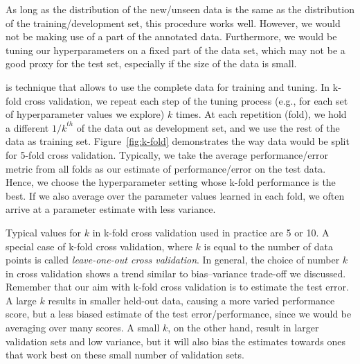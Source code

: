 As long as the distribution of the new/unseen data
is the same as the distribution of the training/development set,
this procedure works well.
However, we would not be making use of a part of the annotated data.
Furthermore, we would be tuning our hyperparameters
on a fixed part of the data set,
which may not be a good proxy for the test set,
especially if the size of the data is small.

\begin{marginfigure}
  \centering
  \caption{\label{fig:k-fold}%
    A schematic description of k-fold cross validation.
    Each row correspond to an experiment
    where the part of the data (marked red) is held-out,
    and the rest (blue segments) is used for training.
  }
\end{marginfigure}
 is technique that allows
to use the complete data for training and tuning.
In k-fold cross validation,
we repeat each step of the tuning process
(e.g., for each set of hyperparameter values we explore) $k$ times.
At each repetition (fold),
we hold a different ${1/k}^{th}$ of the data out as development set,
and we use the rest of the data as training set.
Figure~\ref{fig:k-fold} demonstrates the way data would be split
for 5-fold cross validation.
Typically, we take the average performance/error metric from all folds
as our estimate of performance/error on the test data.
Hence, we choose the hyperparameter setting
whose k-fold performance is the best.
If we also average over the parameter values learned in each fold,
we often arrive at a parameter estimate with less variance.

Typical values for $k$ in k-fold cross validation used in practice
are  \num{5} or \num{10}.
A special case of k-fold cross validation,
where $k$ is equal to the number of data points
is called \emph{leave-one-out cross validation}.
In general, the choice of number $k$ in cross validation
shows a trend similar to bias--variance trade-off we discussed.
Remember that our aim with k-fold cross validation is
to estimate the test error.
A large $k$ results in smaller held-out data,
causing a more varied performance score,
but a less biased estimate of the test error/performance,
since we would be averaging over many scores.
A small $k$, on the other hand,
result in larger validation sets and low variance,
but it will also bias the estimates
towards ones that work best on these small number of validation sets.

